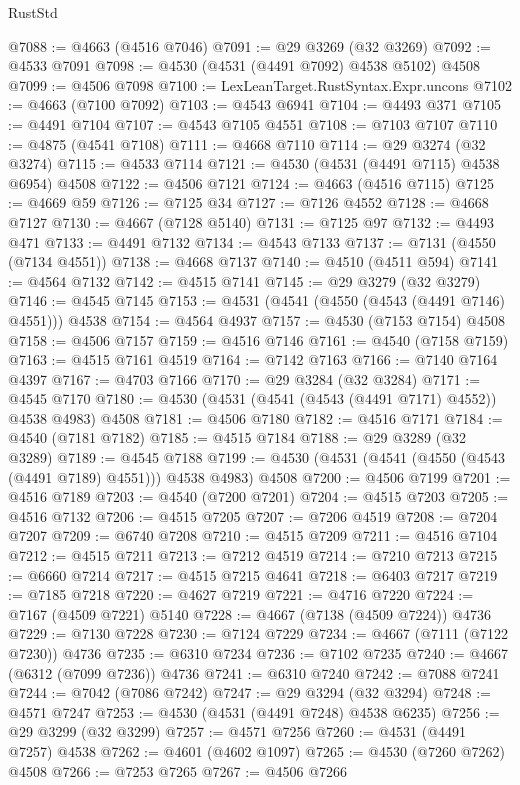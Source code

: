 \begin{lexlean}{RustStd}
\begin{coremodule}
@7088 := @4663 (@4516 @7046)
@7091 := @29 @3269 (@32 @3269)
@7092 := @4533 @7091
@7098 := @4530 (@4531 (@4491 @7092) @4538 @5102) @4508
@7099 := @4506 @7098
@7100 := LexLeanTarget.RustSyntax.Expr.uncons
@7102 := @4663 (@7100 @7092)
@7103 := @4543 @6941
@7104 := @4493 @371
@7105 := @4491 @7104
@7107 := @4543 @7105 @4551
@7108 := @7103 @7107
@7110 := @4875 (@4541 @7108)
@7111 := @4668 @7110
@7114 := @29 @3274 (@32 @3274)
@7115 := @4533 @7114
@7121 := @4530 (@4531 (@4491 @7115) @4538 @6954) @4508
@7122 := @4506 @7121
@7124 := @4663 (@4516 @7115)
@7125 := @4669 @59
@7126 := @7125 @34
@7127 := @7126 @4552
@7128 := @4668 @7127
@7130 := @4667 (@7128 @5140)
@7131 := @7125 @97
@7132 := @4493 @471
@7133 := @4491 @7132
@7134 := @4543 @7133
@7137 := @7131 (@4550 (@7134 @4551))
@7138 := @4668 @7137
@7140 := @4510 (@4511 @594)
@7141 := @4564 @7132
@7142 := @4515 @7141
@7145 := @29 @3279 (@32 @3279)
@7146 := @4545 @7145
@7153 := @4531 (@4541 (@4550 (@4543 (@4491 @7146) @4551))) @4538
@7154 := @4564 @4937
@7157 := @4530 (@7153 @7154) @4508
@7158 := @4506 @7157
@7159 := @4516 @7146
@7161 := @4540 (@7158 @7159)
@7163 := @4515 @7161 @4519
@7164 := @7142 @7163
@7166 := @7140 @7164 @4397
@7167 := @4703 @7166
@7170 := @29 @3284 (@32 @3284)
@7171 := @4545 @7170
@7180 := @4530 (@4531 (@4541 (@4543 (@4491 @7171) @4552)) @4538 @4983) @4508
@7181 := @4506 @7180
@7182 := @4516 @7171
@7184 := @4540 (@7181 @7182)
@7185 := @4515 @7184
@7188 := @29 @3289 (@32 @3289)
@7189 := @4545 @7188
@7199 := @4530 (@4531 (@4541 (@4550 (@4543 (@4491 @7189) @4551))) @4538 @4983) @4508
@7200 := @4506 @7199
@7201 := @4516 @7189
@7203 := @4540 (@7200 @7201)
@7204 := @4515 @7203
@7205 := @4516 @7132
@7206 := @4515 @7205
@7207 := @7206 @4519
@7208 := @7204 @7207
@7209 := @6740 @7208
@7210 := @4515 @7209
@7211 := @4516 @7104
@7212 := @4515 @7211
@7213 := @7212 @4519
@7214 := @7210 @7213
@7215 := @6660 @7214
@7217 := @4515 @7215 @4641
@7218 := @6403 @7217
@7219 := @7185 @7218
@7220 := @4627 @7219
@7221 := @4716 @7220
@7224 := @7167 (@4509 @7221) @5140
@7228 := @4667 (@7138 (@4509 @7224)) @4736
@7229 := @7130 @7228
@7230 := @7124 @7229
@7234 := @4667 (@7111 (@7122 @7230)) @4736
@7235 := @6310 @7234
@7236 := @7102 @7235
@7240 := @4667 (@6312 (@7099 @7236)) @4736
@7241 := @6310 @7240
@7242 := @7088 @7241
@7244 := @7042 (@7086 @7242)
@7247 := @29 @3294 (@32 @3294)
@7248 := @4571 @7247
@7253 := @4530 (@4531 (@4491 @7248) @4538 @6235)
@7256 := @29 @3299 (@32 @3299)
@7257 := @4571 @7256
@7260 := @4531 (@4491 @7257) @4538
@7262 := @4601 (@4602 @1097)
@7265 := @4530 (@7260 @7262) @4508
@7266 := @7253 @7265
@7267 := @4506 @7266

\end{coremodule}
\end{lexlean}
